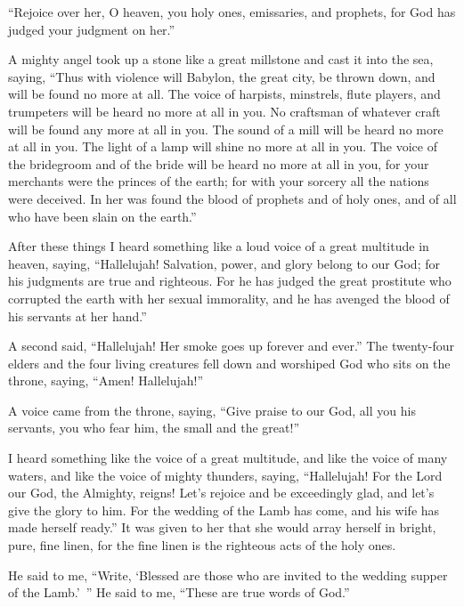 \myverse{}“Rejoice over her, O heaven, you holy ones, emissaries, and
prophets, for God has judged your judgment on her.”

\myverse{}A mighty angel took up a stone like a great millstone and cast
it into the sea, saying, “Thus with violence will Babylon, the great city, be thrown down, and will be
found no more at all.
\myverse{}The voice of harpists, minstrels, flute players, and trumpeters will be heard
no more at all in you. No craftsman of whatever craft will be found any more at all in you. The sound
of a mill will be heard no more at all in you.
\myverse{}The light of a lamp will shine no more at all in you. The voice of the bridegroom
and of the bride will be heard no more at all in you, for your merchants were the princes of the earth;
for with your sorcery all the nations were deceived.
\myverse{}In her was found the blood of prophets and of holy ones, and of all who have
been slain on the earth.”



\mychapter{} \myverse*{}After these things I heard something like a loud voice of a great
multitude in heaven, saying, “Hallelujah! Salvation, power, and glory belong to our God;
\myverse{}for his judgments are true and righteous. For he has judged the great prostitute
who corrupted the earth with her sexual immorality, and he has avenged the blood of his servants at her
hand.”

\myverse{}A second said, “Hallelujah! Her smoke goes up forever and ever.”
\myverse{}The twenty-four elders and the four living creatures fell down and worshiped
God who sits on the throne, saying, “Amen! Hallelujah!”

\myverse{}A voice came from the throne, saying, “Give praise to our God,
all you his servants, you who fear him, the small and the great!”

\myverse{}I heard something like the voice of a great multitude, and like
the voice of many waters, and like the voice of mighty thunders, saying, “Hallelujah! For the Lord our
God, the Almighty, reigns!
\myverse{}Let’s rejoice and be exceedingly glad, and let’s give the glory to him. For
the wedding of the Lamb has come, and his wife has made herself ready.”
\myverse{}It was given to her that she would array herself in bright, pure, fine linen,
for the fine linen is the righteous acts of the holy ones.

\myverse{}He said to me, “Write, ‘Blessed are those who are invited to the
wedding supper of the Lamb.’ ” He said to me, “These are true words of God.”

